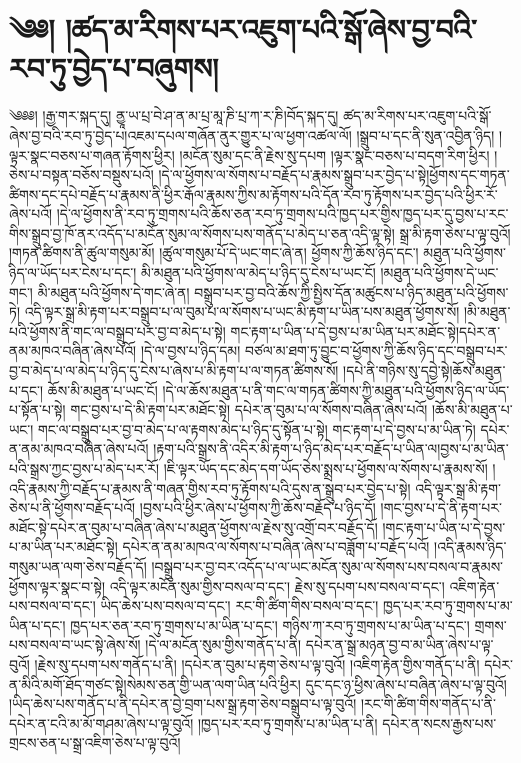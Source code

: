 \setcounter{footnote}{0} 
\chapter{༄༅། །ཚད་མ་རིགས་པར་འཇུག་པའི་སྒོ་ཞེས་བྱ་བའི་རབ་ཏུ་བྱེད་པ་བཞུགས།}༄༅༅། །རྒྱ་གར་སྐད་དུ། ནྱཱ་ཡ་པྲ་བེ་ཤ་ན་མ་པྲ་མཱ་ཎི་པྲ་ཀ་ར་ཎི།བོད་སྐད་དུ། ཚད་མ་རིགས་པར་འཇུག་པའི་སྒོ་ཞེས་བྱ་བའི་རབ་ཏུ་བྱེད་པ།འཇམ་དཔལ་གཞོན་ནུར་གྱུར་པ་ལ་ཕྱག་འཚལ་ལོ། །སྒྲུབ་པ་དང་ནི་སུན་འབྱིན་ཉིད། །ལྟར་སྣང་བཅས་པ་གཞན་རྟོགས་ཕྱིར། །མངོན་སུམ་དང་ནི་རྗེས་སུ་དཔག །ལྟར་སྣང་བཅས་པ་བདག་རིག་ཕྱིར། །ཅེས་པ་བསྟན་བཅོས་བསྡུས་པའོ། །དེ་ལ་ཕྱོགས་ལ་སོགས་པ་བརྗོད་པ་རྣམས་སྒྲུབ་པར་བྱེད་པ་སྟེ།ཕྱོགས་དང་གཏན་ཚིགས་དང་དཔེ་བརྗོད་པ་རྣམས་ནི་ཕྱིར་རྒོལ་རྣམས་ཀྱིས་མ་རྟོགས་པའི་དོན་རབ་ཏུ་རྟོགས་པར་བྱེད་པའི་ཕྱིར་རོ་ཞེས་པའོ། །དེ་ལ་ཕྱོགས་ནི་རབ་ཏུ་གྲགས་པའི་ཆོས་ཅན་རབ་ཏུ་གྲགས་པའི་ཁྱད་པར་གྱིས་ཁྱད་པར་དུ་བྱས་པ་རང་གིས་སྒྲུབ་བྱ་ཁོ་ནར་འདོད་པ་མངོན་སུམ་ལ་སོགས་པས་གནོད་པ་མེད་པ་ཅན་འདི་ལྟ་སྟེ། སྒྲ་མི་རྟག་ཅེས་པ་ལྟ་བུའོ། །གཏན་ཚིགས་ནི་ཚུལ་གསུམ་མོ། །ཚུལ་གསུམ་པོ་དེ་ཡང་གང་ཞེ་ན། ཕྱོགས་ཀྱི་ཆོས་ཉིད་དང་། མཐུན་པའི་ཕྱོགས་ཉིད་ལ་ཡོད་པར་ངེས་པ་དང་། མི་མཐུན་པའི་ཕྱོགས་ལ་མེད་པ་ཉིད་དུ་ངེས་པ་ཡང་ངོ། །མཐུན་པའི་ཕྱོགས་དེ་ཡང་གང་། མི་མཐུན་པའི་ཕྱོགས་དེ་གང་ཞེ་ན། བསྒྲུབ་པར་བྱ་བའི་ཆོས་ཀྱི་སྤྱིས་དོན་མཚུངས་པ་ཉིད་མཐུན་པའི་ཕྱོགས་ཏེ། འདི་ལྟར་སྒྲ་མི་རྟག་པར་བསྒྲུབ་པ་ལ་བུམ་པ་ལ་སོགས་པ་ཡང་མི་རྟག་པ་ཡིན་པས་མཐུན་ཕྱོགས་སོ། །མི་མཐུན་པའི་ཕྱོགས་ནི་གང་ལ་བསྒྲུབ་པར་བྱ་བ་མེད་པ་སྟེ། གང་རྟག་པ་ཡིན་པ་དེ་བྱས་པ་མ་ཡིན་པར་མཐོང་སྟེ།དཔེར་ན་ནམ་མཁའ་བཞིན་ཞེས་པའོ། །དེ་ལ་བྱས་པ་ཉིད་དམ། བཙལ་མ་ཐག་ཏུ་བྱུང་བ་ཕྱོགས་ཀྱི་ཆོས་ཉིད་དང་བསྒྲུབ་པར་བྱ་བ་མེད་པ་ལ་མེད་པ་ཉིད་དུ་ངེས་པ་ཞེས་པ་མི་རྟག་པ་ལ་གཏན་ཚིགས་སོ། །དཔེ་ནི་གཉིས་སུ་དབྱེ་སྟེ།ཆོས་མཐུན་པ་དང་། ཆོས་མི་མཐུན་པ་ཡང་ངོ། །དེ་ལ་ཆོས་མཐུན་པ་ནི་གང་ལ་གཏན་ཚིགས་ཀྱི་མཐུན་པའི་ཕྱོགས་ཉིད་ལ་ཡོད་པ་སྟོན་པ་སྟེ། གང་བྱས་པ་དེ་མི་རྟག་པར་མཐོང་སྟེ། དཔེར་ན་བུམ་པ་ལ་སོགས་བཞིན་ཞེས་པའོ། །ཆོས་མི་མཐུན་པ་ཡང་། གང་ལ་བསྒྲུབ་པར་བྱ་བ་མེད་པ་ལ་རྟགས་མེད་པ་ཉིད་དུ་སྟོན་པ་སྟེ། གང་རྟག་པ་དེ་བྱས་པ་མ་ཡིན་ཏེ། དཔེར་ན་ནམ་མཁའ་བཞིན་ཞེས་པའོ། །རྟག་པའི་སྒྲས་ནི་འདིར་མི་རྟག་པ་ཉིད་མེད་པར་བརྗོད་པ་ཡིན་ལ།བྱས་པ་མ་ཡིན་པའི་སྒྲས་ཀྱང་བྱས་པ་མེད་པར་རོ། །ཇི་ལྟར་ཡོད་དང་མེད་དག་ཡོད་ཅེས་སྨྲས་པ་ཕྱོགས་ལ་སོགས་པ་རྣམས་སོ། །འདི་རྣམས་ཀྱི་བརྗོད་པ་རྣམས་ནི་གཞན་གྱིས་རབ་ཏུ་རྟོགས་པའི་དུས་ན་སྒྲུབ་པར་བྱེད་པ་སྟེ། འདི་ལྟར་སྒྲ་མི་རྟག་ཅེས་པ་ནི་ཕྱོགས་བརྗོད་པའོ། །བྱས་པའི་ཕྱིར་ཞེས་པ་ཕྱོགས་ཀྱི་ཆོས་བརྗོད་པ་ཉིད་དོ། །གང་བྱས་པ་དེ་ནི་རྟག་པར་མཐོང་སྟེ་དཔེར་ན་བུམ་པ་བཞིན་ཞེས་པ་མཐུན་ཕྱོགས་ལ་རྗེས་སུ་འགྲོ་བར་བརྗོད་དོ། །གང་རྟག་པ་ཡིན་པ་དེ་བྱས་པ་མ་ཡིན་པར་མཐོང་སྟེ། དཔེར་ན་ནམ་མཁའ་ལ་སོགས་པ་བཞིན་ཞེས་པ་བཟློག་པ་བརྗོད་པའོ། །འདི་རྣམས་ཉིད་གསུམ་ཡན་ལག་ཅེས་བརྗོད་དོ། །བསྒྲུབ་པར་བྱ་བར་འདོད་པ་ལ་ཡང་མངོན་སུམ་ལ་སོགས་པས་བསལ་བ་རྣམས་ཕྱོགས་ལྟར་སྣང་བ་སྟེ། འདི་ལྟར་མངོན་སུམ་གྱིས་བསལ་བ་དང་། རྗེས་སུ་དཔག་པས་བསལ་བ་དང་། འཇིག་རྟེན་པས་བསལ་བ་དང་། ཡིད་ཆེས་པས་བསལ་བ་དང་། རང་གི་ཚིག་གིས་བསལ་བ་དང་། ཁྱད་པར་རབ་ཏུ་གྲགས་པ་མ་ཡིན་པ་དང་། ཁྱད་པར་ཅན་རབ་ཏུ་གྲགས་པ་མ་ཡིན་པ་དང་། གཉིས་ཀ་རབ་ཏུ་གྲགས་པ་མ་ཡིན་པ་དང་། གྲགས་པས་བསལ་བ་ཡང་སྟེ་ཞེས་སོ། །དེ་ལ་མངོན་སུམ་གྱིས་གནོད་པ་ནི། དཔེར་ན་སྒྲ་མཉན་བྱ་བ་མ་ཡིན་ཞེས་པ་ལྟ་བུའོ། །རྗེས་སུ་དཔག་པས་གནོད་པ་ནི། །དཔེར་ན་བུམ་པ་རྟག་ཅེས་པ་ལྟ་བུའོ། །འཇིག་རྟེན་གྱིས་གནོད་པ་ནི། དཔེར་ན་མིའི་མགོ་ཐོད་གཙང་སྟེ།སེམས་ཅན་གྱི་ཡན་ལག་ཡིན་པའི་ཕྱིར། དུང་དང་ཉ་ཕྱིས་ཞེས་པ་བཞིན་ཞེས་པ་ལྟ་བུའོ། །ཡིད་ཆེས་པས་གནོད་པ་ནི་དཔེར་ན་བྱེ་བྲག་པས་སྒྲ་རྟག་ཅེས་བསྒྲུབ་པ་ལྟ་བུའོ། །རང་གི་ཚིག་གིས་གནོད་པ་ནི་དཔེར་ན་ངའི་མ་མོ་གཤམ་ཞེས་པ་ལྟ་བུའོ། །ཁྱད་པར་རབ་ཏུ་གྲགས་པ་མ་ཡིན་པ་ནི། དཔེར་ན་སངས་རྒྱས་པས་གྲངས་ཅན་པ་སྒྲ་འཇིག་ཅེས་པ་ལྟ་བུའོ། 